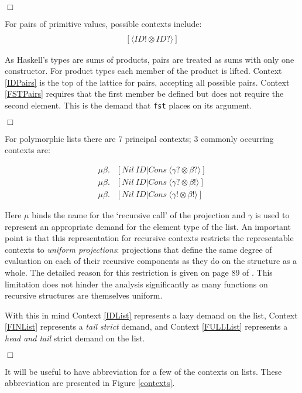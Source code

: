 \hfill$\Box$

For pairs of primitive values, possible contexts include:
\begin{align}
[\langle ID? \otimes ID? \rangle] \label{IDPairs} \\
[\langle ID! \otimes ID? \rangle] \label{FSTPairs}
\end{align}


As Haskell's types are sums of products, pairs are treated as sums with only
one constructor.  For product types each member of the product is lifted.
Context \ref{IDPairs} is the top of the lattice for pairs, accepting all
possible pairs. Context \ref{FSTPairs} requires that the first member be
defined but does not require the second element. This is the demand that
\verb-fst- places on its argument.

\hfill$\Box$

For polymorphic lists there are 7 principal contexts; 3 commonly occurring contexts are:

\begin{align}
    \mu\beta.&[Nil\ ID | Cons\ \langle \gamma? \otimes \beta?\rangle] \label{IDList} \\
    \mu\beta.&[Nil\ ID | Cons\ \langle \gamma? \otimes \beta!\rangle] \label{FINList} \\
    \mu\beta.&[Nil\ ID | Cons\ \langle \gamma! \otimes \beta!\rangle] \label{FULLList}
\end{align}


Here $\mu$ binds the name for the `recursive call' of the projection and
$\gamma$ is used to represent an appropriate demand for the element type of the
list.  An important point is that this representation for recursive contexts
restricts the representable contexts to \emph{uniform projections}: projections
that define the same degree of evaluation on each of their recursive components
as they do on the structure as a whole. The detailed reason for this
restriction is given on page 89 of \cite{hinze1995projection}. This limitation
does not hinder the analysis significantly as many functions on recursive
structures are themselves uniform.

With this in mind Context \ref{IDList} represents a lazy demand on the list,
Context \ref{FINList} represents a \emph{tail strict} demand, and Context
\ref{FULLList} represents a \emph{head and tail} strict demand on the list.

\hfill$\Box$

It will be useful to have abbreviation for a few of the contexts on lists. These
abbreviation are presented in Figure \ref{contexts}.


